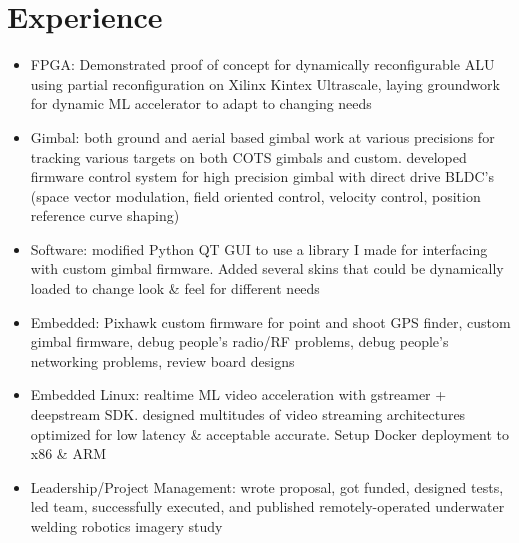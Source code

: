 \documentclass[11pt, a4paper]{article}
\begin{document}
\headerSimple

\section*{Experience}
{\scriptsize

  \workplaceBeam

  \workplaceGTRI
  \begin{itemize}
    \item FPGA: Demonstrated proof of concept for dynamically reconfigurable ALU using partial reconfiguration on Xilinx Kintex Ultrascale, laying groundwork for dynamic ML accelerator to adapt to changing needs
    \item Gimbal: both ground and aerial based gimbal work at various precisions for tracking various targets on both COTS gimbals and custom. developed firmware control system for high precision gimbal with direct drive BLDC’s (space vector modulation, field oriented control, velocity control, position reference curve shaping)
    \item Software: modified Python QT GUI to use a library I made for interfacing with custom gimbal firmware. Added several skins that could be dynamically loaded to change look \& feel for different needs
    \item Embedded: Pixhawk custom firmware for point and shoot GPS finder, custom gimbal firmware, debug people's radio/RF problems, debug people's networking problems, review board designs
    \item Embedded Linux: realtime ML video acceleration with gstreamer + deepstream SDK. designed multitudes of video streaming architectures optimized for low latency \& acceptable accurate. Setup Docker deployment to x86 \& ARM 
    \item Leadership/Project Management: wrote proposal, got funded, designed tests, led team, successfully executed, and published remotely-operated underwater
  welding robotics imagery study
  \end{itemize}

  \workplaceModernComputing

  \workplaceClappingDetector

  \workplaceDSPFPGA

  \workplaceEmotionSpeech
  \experienceEmotionSpeechLong

  \workplaceSeniorDesign
  
  \workplaceDDL

  \workplaceVLSI

  \workplaceMLforT
  
  \workplaceConvexMind

}
\end{document}
